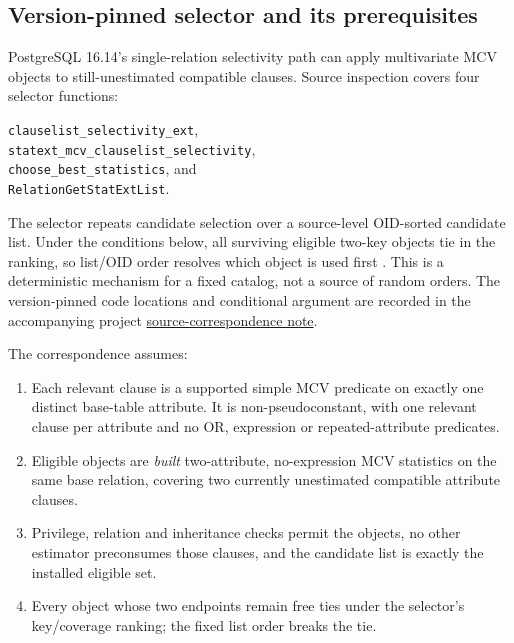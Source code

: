 \documentclass[sigconf, nonacm]{acmart}
\begin{document}
\subsection{Version-pinned selector and its prerequisites}
PostgreSQL 16.14's single-relation selectivity path can apply
multivariate MCV objects to still-unestimated compatible
clauses. Source inspection covers four selector functions:\\
{\raggedright
\texttt{clauselist\_selectivity\_ext},\\
\texttt{statext\_mcv\_clauselist\_selectivity},\\
\texttt{choose\_best\_statistics}, and\\
\texttt{RelationGetStatExtList}.\par}
The selector repeats candidate selection over a source-level
OID-sorted candidate list. Under the conditions below,
all surviving eligible two-key objects tie in the ranking,
so list/OID order resolves which object is used first
\cite{pg16stats}. This is a deterministic mechanism
for a fixed catalog, not a source of random orders.
The version-pinned code locations and conditional argument
are recorded in the accompanying project
\href{https://github.com/1951123/ess-research/blob/main/notes/pg-mcv-maximal-matching-correspondence.md}
{source-correspondence note}.

The correspondence assumes:
\begin{enumerate}
\item[\textbf{A1.}] Each relevant clause is a supported simple MCV
  predicate on exactly one distinct base-table attribute. It is
  non-pseudoconstant, with one relevant clause per attribute and no OR,
  expression or repeated-attribute predicates.
\item[\textbf{A2.}] Eligible objects are \emph{built}
  two-attribute, no-expression MCV statistics on the same
  base relation, covering two currently unestimated
  compatible attribute clauses.
\item[\textbf{A3.}] Privilege, relation and inheritance checks
  permit the objects, no other estimator preconsumes those
  clauses, and the candidate list is exactly the
  installed eligible set.
\item[\textbf{A4.}] Every object whose two endpoints remain
  free ties under the selector's key/coverage ranking;
  the fixed list order breaks the tie.
\end{enumerate}
\end{document}
